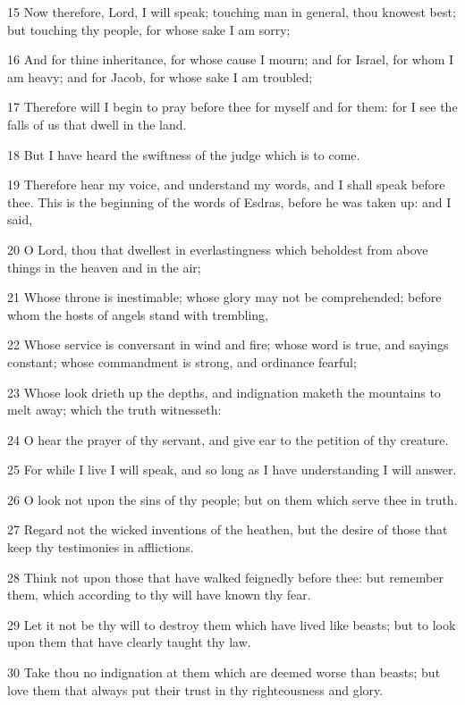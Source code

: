 \par 15 Now therefore, Lord, I will speak; touching man in general, thou knowest best; but touching thy people, for whose sake I am sorry;
\par 16 And for thine inheritance, for whose cause I mourn; and for Israel, for whom I am heavy; and for Jacob, for whose sake I am troubled;
\par 17 Therefore will I begin to pray before thee for myself and for them: for I see the falls of us that dwell in the land.
\par 18 But I have heard the swiftness of the judge which is to come.
\par 19 Therefore hear my voice, and understand my words, and I shall speak before thee. This is the beginning of the words of Esdras, before he was taken up: and I said,
\par 20 O Lord, thou that dwellest in everlastingness which beholdest from above things in the heaven and in the air;
\par 21 Whose throne is inestimable; whose glory may not be comprehended; before whom the hosts of angels stand with trembling,
\par 22 Whose service is conversant in wind and fire; whose word is true, and sayings constant; whose commandment is strong, and ordinance fearful;
\par 23 Whose look drieth up the depths, and indignation maketh the mountains to melt away; which the truth witnesseth:
\par 24 O hear the prayer of thy servant, and give ear to the petition of thy creature.
\par 25 For while I live I will speak, and so long as I have understanding I will answer.
\par 26 O look not upon the sins of thy people; but on them which serve thee in truth.
\par 27 Regard not the wicked inventions of the heathen, but the desire of those that keep thy testimonies in afflictions.
\par 28 Think not upon those that have walked feignedly before thee: but remember them, which according to thy will have known thy fear.
\par 29 Let it not be thy will to destroy them which have lived like beasts; but to look upon them that have clearly taught thy law.
\par 30 Take thou no indignation at them which are deemed worse than beasts; but love them that always put their trust in thy righteousness and glory.
